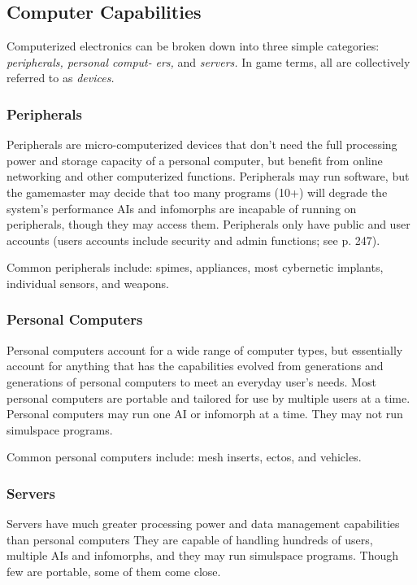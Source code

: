 \subsection{Computer Capabilities}

Computerized electronics can be broken down into 
three simple categories: \textit{peripherals, personal comput-}
\textit{ers,  }and  \textit{servers.} In game terms, all are collectively 
referred to as \textit{devices.}

\subsubsection{Peripherals}

Peripherals are micro-computerized devices that don't 
need the full processing power and storage capacity of 
a personal computer, but benefit from online networking
and other computerized functions. Peripherals may
run software, but the gamemaster may decide that too 
many programs (10+) will degrade the system's performance
AIs and infomorphs are incapable of running
on peripherals, though they may access them. Peripherals
only have public and user accounts (users accounts
include security and admin functions; see p. 247).

Common peripherals include: spimes, appliances, most 
cybernetic implants, individual sensors, and weapons.

\subsubsection{Personal Computers}

Personal computers account for a wide range of computer
types, but essentially account for anything that
has the capabilities evolved from generations and generations
of personal computers to meet an everyday
user's needs. Most personal computers are portable 
and tailored for use by multiple users at a time. Personal
computers may run one AI or infomorph at a
time. They may not run simulspace programs.

Common personal computers include: mesh inserts, 
ectos, and vehicles.

\subsubsection{Servers}

Servers have much greater processing power and 
data management capabilities than personal computers
They are capable of handling hundreds of users,
multiple AIs and infomorphs, and they may run 
simulspace programs. Though few are portable, some 
of them come close.

